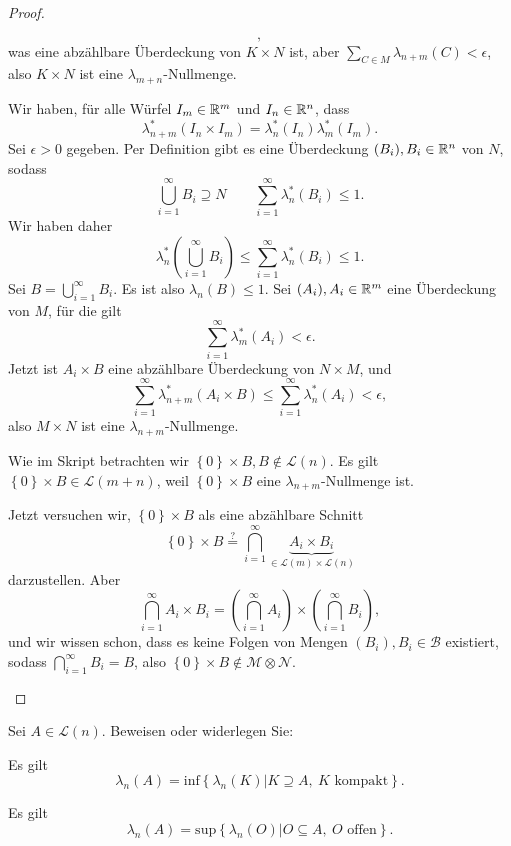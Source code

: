 \begin{proof}
\begin{parts}
\[		,\]
		was eine abzählbare Überdeckung von $K\times N$ ist, aber $\sum_{C\in M}\lambda_{n+m}(C)<\epsilon$, also $K\times N$ ist eine $\lambda_{m+n}$-Nullmenge.
	\item Wir haben, f\"{u}r alle Würfel $I_m\in \mathbb{R}^m$ und $I_n\in \mathbb{R}^n$, dass
		\[
			\lambda_{n+m}^*(I_n\times I_m) =\lambda_n^*(I_n)\lambda_m^*(I_m)
		.\] 
	Sei $\epsilon>0$ gegeben. Per Definition gibt es eine Überdeckung $(B_i),B_i\in \mathbb{R}^n$ von $N$, sodass
	\[
	\bigcup_{i=1} ^\infty B_i\supseteq N\qquad \sum_{i=1}^{\infty} \lambda_n^*(B_i)\le 1
	.\] 
	Wir haben daher
\[
\lambda_n^*\left( \bigcup_{i=1} ^\infty B_i \right) \le \sum_{i=1}^{\infty} \lambda_n^*(B_i)\le 1
.\] 
Sei $B=\bigcup_{i=1}^\infty B_i$. Es ist also $\lambda_n(B)\le 1$. Sei $(A_i),A_i\in \mathbb{R}^m$ eine Überdeckung von $M$, f\"{u}r die gilt
	\[
	\sum_{i=1}^{\infty} \lambda_m^*(A_i)<\epsilon
	.\] 
	Jetzt ist $A_i\times B$ eine abzählbare Überdeckung von $N\times M$, und
	\[
		\sum_{i=1}^\infty\lambda_{n+m}^*(A_i\times B)\le \sum_{i=1}^\infty \lambda_n^*(A_i)<\epsilon
	,\]
	also $M\times N$ ist eine $\lambda_{n+m}$-Nullmenge.
\item Wie im Skript betrachten wir $\left\{ 0 \right\} \times B, B\not\in  \mathcal{L}(n)$. Es gilt $\left\{ 0 \right\} \times B\in \mathcal{L}(m+n)$, weil $\left\{ 0 \right\} \times B$ eine $\lambda_{n+m}$-Nullmenge ist.

	Jetzt versuchen wir, $\left\{ 0 \right\} \times B$ als eine abzählbare Schnitt
	\[
		\left\{ 0 \right\} \times B\overset{?}{=}\bigcap_{i=1}^\infty \underbrace{A_i\times B_i}_{\in \mathcal{L}(m)\times \mathcal{L}(n)}
	\] 
	darzustellen. Aber
	\[
	\bigcap_{i=1}^\infty A_i\times B_i=\left( \bigcap_{i=1} ^\infty A_i \right) \times \left(\bigcap_{i=1}^\infty B_i\right)
	,\] 
	und wir wissen schon, dass es keine Folgen von Mengen $(B_i),B_i\in \mathcal{B}$ existiert, sodass $\bigcap_{i=1}^\infty B_i=B$, also $\left\{ 0 \right\} \times B\not\in \mathcal{M}\otimes \mathcal{N}$.\qedhere
	\end{parts}
\end{proof}
\begin{Problem}
	Sei $A\in \mathcal{L}(n)$. Beweisen oder widerlegen Sie:
	\begin{parts}
	\item Es gilt
		\[
			\lambda_n(A)=\text{inf}\left\{ \lambda_n(K)|K\supseteq A,~K\text{ kompakt} \right\} 
		.\] 
	\item Es gilt
		\[
			\lambda_n(A)=\text{sup}\left\{ \lambda_n(O)|O\subseteq A,~O\text{ offen} \right\} 
		.\] 
	\end{parts}
\end{Problem}
